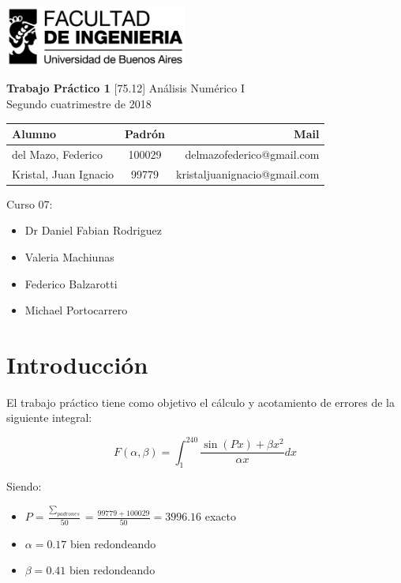 \documentclass[11pt,a4paper]{article}
\begin{document}
\begin{titlepage}
	\hfill\includegraphics[width=6cm]{figuras/fiuba.jpg}
    \begin{center}
    \vfill
    \Huge \textbf{Trabajo Práctico 1}
    \vskip2cm
    \Large [75.12] Análisis Numérico I\\
    Segundo cuatrimestre de 2018
    \vfill
    \begin{tabular}{|l|c|r|}
	\hline
	Alumno & Padrón & Mail\\
	\hline
	\hline
	del Mazo, Federico & 100029 & delmazofederico@gmail.com\\
	\hline
	Kristal, Juan Ignacio & 99779 & kristaljuanignacio@gmail.com\\
	\hline
	\end{tabular}
    \vskip2cm
    \end{center}

    Curso 07:

    \begin{itemize}
    \item Dr Daniel Fabian Rodriguez
    \item Valeria Machiunas
    \item Federico Balzarotti
    \item Michael Portocarrero
    \end{itemize}

\end{titlepage}



\tableofcontents
\thispagestyle{onlyheader}
\newpage

\setcounter{page}{1}

\section{Introducción}
El trabajo práctico tiene como objetivo el cálculo y acotamiento de errores de la siguiente integral:

\[ F(\alpha,\beta) = \int_{1}^{240}  \frac{\sin{(P x)}  + \beta x^2}{\alpha x} dx \]

Siendo:
\begin{itemize}
\item \( P = \frac{\sum\limits_{padrones}^{}}{50} = \frac{99779 + 100029}{50} = 3996.16 \) exacto 
\item \( \alpha = 0.17 \) bien redondeando
\item \( \beta = 0.41 \) bien redondeando
\end{itemize}
\end{document}
